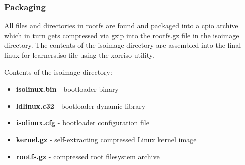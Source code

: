 
\subsubsection{Packaging}

All files and directories in rootfs are found and packaged into a cpio archive which in turn gets compressed via gzip into the rootfs.gz file in the isoimage directory. The contents of the isoimage directory are assembled into the final linux-for-learners.iso file using the xorriso utility.


Contents of the isoimage directory:

\begin{itemize}
    \item \textbf{isolinux.bin} - bootloader binary
    \item \textbf{ldlinux.c32} - bootloader dynamic library
    \item \textbf{isolinux.cfg} - bootloader configuration file
    \item \textbf{kernel.gz} - self-extracting compressed Linux kernel image
    \item \textbf{rootfs.gz} - compressed root filesystem archive 
\end{itemize}
